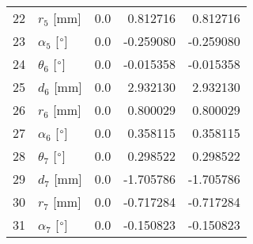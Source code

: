 \documentclass{standalone}%
\begin{document}
\begin{tabular}{llrrr}
22 &              $r_{5}$ [mm] &       0.0 &   0.812716 &   0.812716 \\
23 &  $\alpha_{5}$ [$\degree$] &       0.0 &  -0.259080 &  -0.259080 \\
24 &  $\theta_{6}$ [$\degree$] &       0.0 &  -0.015358 &  -0.015358 \\
25 &              $d_{6}$ [mm] &       0.0 &   2.932130 &   2.932130 \\
26 &              $r_{6}$ [mm] &       0.0 &   0.800029 &   0.800029 \\
27 &  $\alpha_{6}$ [$\degree$] &       0.0 &   0.358115 &   0.358115 \\
28 &  $\theta_{7}$ [$\degree$] &       0.0 &   0.298522 &   0.298522 \\
29 &              $d_{7}$ [mm] &       0.0 &  -1.705786 &  -1.705786 \\
30 &              $r_{7}$ [mm] &       0.0 &  -0.717284 &  -0.717284 \\
31 &  $\alpha_{7}$ [$\degree$] &       0.0 &  -0.150823 &  -0.150823 \\
\bottomrule
\end{tabular}
%
\end{document}
